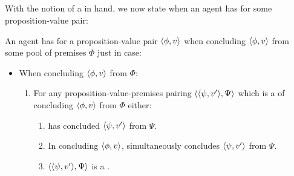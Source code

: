 \subsection{\zetaS{}}
\label{sec:zs2}

\begin{note}
  With the notion of a \requ{} in hand, we now state when an agent has  for some proposition-value pair:

  \begin{idea}[\izetaS{}]
    \label{idea:zetaS}
    An agent \vAgent{} has \emph{\izetaS{}} for a proposition-value pair \(\langle \phi, v \rangle\) when concluding \(\langle \phi, v \rangle\) from some pool of premises \(\Phi\) just in case:
    \begin{itemize}
    \item When concluding \(\langle \phi, v \rangle\) from \(\Phi\):
      \begin{enumerate}[label=\arabic*., ref=\named{CS:\arabic*}]
      \item
        \label{idea:zetaS::requ}
        For any proposition-value-premises pairing \(\langle \langle \psi, v' \rangle, \Psi \rangle\) which is a \requ{} of concluding \(\langle \phi, v \rangle\) from \(\Phi\) either:
        \begin{enumerate}[label=\alph*., ref=\named{CS:1.\alph*}]
        \item
          \label{idea:zetaS::requ-sat:Past}
          \vAgent{} has concluded \(\langle \psi, v' \rangle\) from \(\Psi\).
        \item
          \label{idea:zetaS::requ-sat:Pres}
          In concluding \(\langle \phi, v \rangle\), \vAgent{} simultaneously concludes \(\langle \psi, v' \rangle\) from \(\Psi\).
        \item
          \label{idea:zetaS::requ-sat:Forgone}
          \(\langle \langle \psi, v' \rangle, \Psi \rangle\) is a .
        \end{enumerate}
      \end{enumerate}
    \end{itemize}
    \vspace{-\baselineskip}
  \end{idea}
\end{note}

